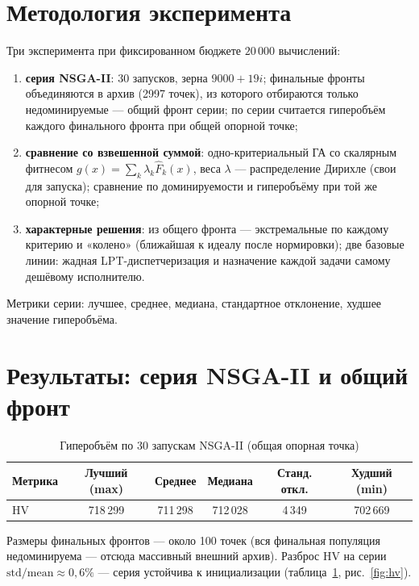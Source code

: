 \documentclass[12pt,a4paper]{article}
\begin{document}
\section{Методология эксперимента}

Три эксперимента при фиксированном бюджете $20\,000$ вычислений:
\begin{enumerate}
\item \textbf{серия NSGA-II}: 30 запусков, зерна $9000 + 19i$; финальные
  фронты объединяются в архив (2997 точек), из которого отбираются только
  недоминируемые --- общий фронт серии; по серии считается гиперобъём
  каждого финального фронта при общей опорной точке;
\item \textbf{сравнение со взвешенной суммой}: одно-критериальный ГА со
  скалярным фитнесом $g(x) = \sum_k \lambda_k \hat F_k(x)$, веса
  $\lambda$ --- распределение Дирихле (свои для запуска); сравнение по
  доминируемости и гиперобъёму при той же опорной точке;
\item \textbf{характерные решения}: из общего фронта --- экстремальные по
  каждому критерию и «колено» (ближайшая к идеалу после нормировки); две
  базовые линии: жадная LPT-диспетчеризация и назначение каждой задачи
  самому дешёвому исполнителю.
\end{enumerate}

Метрики серии: лучшее, среднее, медиана, стандартное отклонение, худшее
значение гиперобъёма.

\section{Результаты: серия NSGA-II и общий фронт}

\begin{table}[H]
\centering
\small
\caption{Гиперобъём по 30 запускам NSGA-II (общая опорная точка)}
\label{tab:hv}
\begin{tabular}{lccccc}
\toprule
Метрика & Лучший (max) & Среднее & Медиана & Станд. откл. & Худший (min) \\
\midrule
HV & 718\,299 & 711\,298 & 712\,028 & 4\,349 & 702\,669 \\
\bottomrule
\end{tabular}
\end{table}

Размеры финальных фронтов --- около 100 точек (вся финальная популяция
недоминируема --- отсюда массивный внешний архив). Разброс HV на серии
$\mathrm{std}/\mathrm{mean} \approx 0{,}6\%$ --- серия устойчива к
инициализации (таблица~\ref{tab:hv}, рис.~\ref{fig:hv}).
\end{document}

